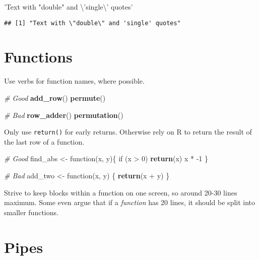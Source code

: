 \documentclass[]{book}
\newenvironment{Shaded}{\begin{snugshade}}{\end{snugshade}}
\newcommand{\KeywordTok}[1]{\textcolor[rgb]{0.13,0.29,0.53}{\textbf{{#1}}}}
\newcommand{\DecValTok}[1]{\textcolor[rgb]{0.00,0.00,0.81}{{#1}}}
\newcommand{\CharTok}[1]{\textcolor[rgb]{0.31,0.60,0.02}{{#1}}}
\newcommand{\StringTok}[1]{\textcolor[rgb]{0.31,0.60,0.02}{{#1}}}
\newcommand{\CommentTok}[1]{\textcolor[rgb]{0.56,0.35,0.01}{\textit{{#1}}}}
\newcommand{\NormalTok}[1]{{#1}}
\begin{document}
\begin{Shaded}
\begin{Highlighting}[]
\StringTok{'Text with "double" and }\CharTok{\textbackslash{}'}\StringTok{single}\CharTok{\textbackslash{}'}\StringTok{ quotes'}
\end{Highlighting}
\end{Shaded}

\begin{verbatim}
## [1] "Text with \"double\" and 'single' quotes"
\end{verbatim}

\chapter{Functions}\label{style-fun}

Use verbs for function names, where possible.

\begin{Shaded}
\begin{Highlighting}[]
\CommentTok{# Good}
\KeywordTok{add_row}\NormalTok{()}
\KeywordTok{permute}\NormalTok{()}

\CommentTok{# Bad}
\KeywordTok{row_adder}\NormalTok{()}
\KeywordTok{permutation}\NormalTok{()}
\end{Highlighting}
\end{Shaded}

Only use \texttt{return()} for early returns. Otherwise rely on R to
return the result of the last row of a function.

\begin{Shaded}
\begin{Highlighting}[]
\CommentTok{# Good}
\NormalTok{find_abs <-}\StringTok{ }\NormalTok{function(x, y)\{}
  \NormalTok{if (x >}\StringTok{ }\DecValTok{0}\NormalTok{) }\KeywordTok{return}\NormalTok{(x)}
  \NormalTok{x *}\StringTok{ }\NormalTok{-}\DecValTok{1}
\NormalTok{\}}

\CommentTok{# Bad}
\NormalTok{add_two <-}\StringTok{ }\NormalTok{function(x, y) \{}
  \KeywordTok{return}\NormalTok{(x +}\StringTok{ }\NormalTok{y)}
\NormalTok{\}}
\end{Highlighting}
\end{Shaded}

Strive to keep blocks within a function on one screen, so around 20-30
lines maximum. Some even argue that if a \emph{function} has 20 lines,
it should be split into smaller functions.

\chapter{Pipes}\label{style-pipes}
\end{document}
